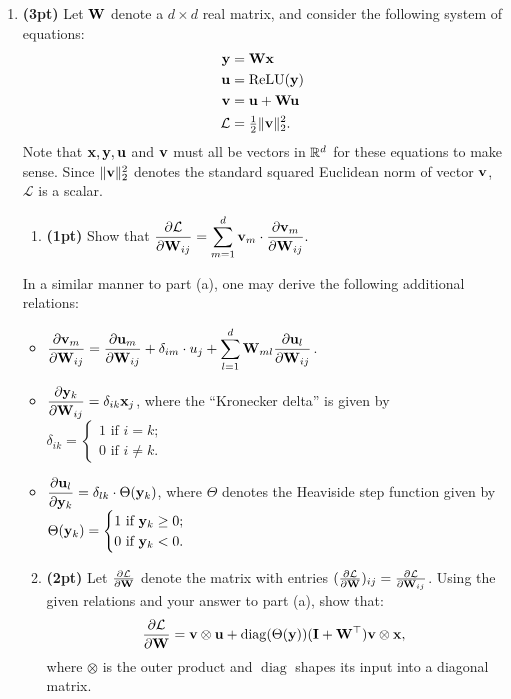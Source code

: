 \documentclass[12pt,letterpaper]{article}
\begin{document}
\begin{enumerate}[resume]
    \item \textbf{(3pt)} Let ${\mathbf{W}}$ denote a $d\times d$ real matrix, and consider the following system of equations: \begin{align}
        {\mathbf{y}} & = {\mathbf{W}} {\mathbf{x}} \label{eq:first}\\
        {\mathbf{u}} &= \operatorname{ReLU} ({\mathbf{y}})\\
        {\mathbf{v}} & = {\mathbf{u}} + {\mathbf{W}} {\mathbf{u}}\\
        \mathcal{L} &= \tfrac{1}{2} \|{\mathbf{v}}\|_2^2. \label{eq:last}
    \end{align}
    Note that ${\mathbf{x}}, {\mathbf{y}}, {\mathbf{u}}$ and ${\mathbf{v}}$ must all be vectors in $\mathbb{R}^d$ for these equations to make sense. Since $\|{\mathbf{v}}\|_2^2$ denotes the standard squared Euclidean norm of vector ${\mathbf{v}}$, $\mathcal{L}$ is a scalar.

    \begin{enumerate}
       \item \textbf{(1pt)} Show that $\displaystyle\frac{\partial \mathcal{L}}{\partial {\mathbf{W}}_{ij}} = \sum_{m=1}^d {\mathbf{v}}_m \cdot \displaystyle\frac{\partial {\mathbf{v}}_m}{\partial {\mathbf{W}}_{ij}}.$
       \end{enumerate}
       
In a similar manner to part (a), one may derive the following additional relations:
\begin{itemize}
    \item $\displaystyle\frac{\partial {\mathbf{v}}_m}{\partial {\mathbf{W}}_{ij}} = \frac{\partial {\mathbf{u}}_m}{\partial {\mathbf{W}}_{ij}} + \delta_{im}\cdot u_j + \sum_{l=1}^d {\mathbf{W}}_{ml}\frac{\partial {\mathbf{u}}_l}{\partial {\mathbf{W}}_{ij}}$.
    \item $\displaystyle\frac{\partial {\mathbf{y}}_k}{\partial {\mathbf{W}}_{ij}} = \delta_{ik} {\mathbf{x}}_j$, 
    \newline where the ``Kronecker delta'' is given by $\displaystyle\delta_{ik}=\begin{cases}1 \text{ if } i=k; \\ 0 \text { if } i \neq k.\end{cases}$
    \item $\displaystyle \frac{\partial {\mathbf{u}}_l}{\partial {\mathbf{y}}_k} = \delta_{lk} \cdot \Theta({\mathbf{y}}_k)$, 
    \newline where $\Theta$ 
    denotes the Heaviside step function given by $\displaystyle\Theta({\mathbf{y}}_k)=\begin{cases}1 \text{ if } {\mathbf{y}}_k\geq0; \\ 0 \text { if } {\mathbf{y}}_k < 0.\end{cases}$
\end{itemize}
       \begin{enumerate}
       \setcounter{enumii}{1}
       \item \textbf{(2pt)} Let $\frac{\partial \mathcal{L}}{\partial {\mathbf{W}}}$ denote the matrix with entries $(\frac{\partial \mathcal{L}}{\partial {\mathbf{W}}})_{ij} = \frac{\partial \mathcal{L}}{\partial {\mathbf{W}}_{ij}}$. 
       Using the given relations and your answer to part (a),
       show that:
       $$\frac{\partial \mathcal{L}}{\partial {\mathbf{W}}} = {\mathbf{v}} \otimes {\mathbf{u}} + \operatorname{diag}(\Theta({\mathbf{y}})) ({\mathbf{I}} + {\mathbf{W}}^\top) {\mathbf{v}} \otimes {\mathbf{x}},$$
       where $\otimes$ is the outer product and $\operatorname{diag}$ shapes its input into a diagonal matrix.


\end{enumerate}
\end{enumerate}
\end{document}
